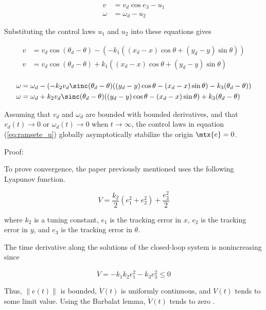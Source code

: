 \begin{align*}
  v &= v_d\cos e_3 - u_1 \\
  \omega &= \omega_d - u_2
\end{align*}

Substituting the control laws $u_1$ and $u_2$ into these equations gives

\begin{align*}
  v &= v_d\cos(\theta_d - \theta) -
    (-k_1 ((x_d - x) \cos\theta + (y_d - y) \sin\theta)) \\
  v &= v_d\cos(\theta_d - \theta) +
    k_1 ((x_d - x) \cos\theta + (y_d - y) \sin\theta) \\
\end{align*}

\begin{align*}
  \omega &= \omega_d -
    \left(-k_2 v_d \sinc(\theta_d - \theta)
    ((y_d - y) \cos\theta - (x_d - x) \sin\theta) -
      k_3 (\theta_d - \theta)\right) \\
  \omega &= \omega_d + k_2 v_d \sinc(\theta_d - \theta)
    ((y_d - y) \cos\theta - (x_d - x) \sin\theta) + k_3 (\theta_d - \theta)
\end{align*}

\begin{theorem}
  Assuming that $v_d$ and $\omega_d$ are bounded with bounded derivatives, and
  that $v_d(t) \rightarrow 0$ or $\omega_d(t) \rightarrow 0$ when
  $t \rightarrow \infty$, the control laws in equation (\ref{eq:ramsete_u})
  globally asymptotically stabilize the origin $\mtx{e} = 0$.

  Proof:

  To prove convergence, the paper previously mentioned uses the following
  Lyapunov function.

  \begin{equation*}
    V = \frac{k_2}{2}(e_1^2 + e_2^2) + \frac{e_3^2}{2}
  \end{equation*}

  where $k_2$ is a tuning constant, $e_1$ is the tracking error in $x$, $e_2$ is
  the tracking error in $y$, and $e_3$ is the tracking error in $\theta$.

  The time derivative along the solutions of the closed-loop \gls{system} is
  nonincreasing since

  \begin{equation*}
    \dot{V} = -k_1 k_2 e_1^2 - k_3 e_3^2 \leq 0
  \end{equation*}

  Thus, $\lVert e(t) \rVert$ is bounded, $\dot{V}(t)$ is uniformly continuous,
  and $V(t)$ tends to some limit value. Using the Barbalat lemma, $\dot{V}(t)$
  tends to zero \cite{bib:ctrl_wheeled_mobile_robots}.
\end{theorem}

